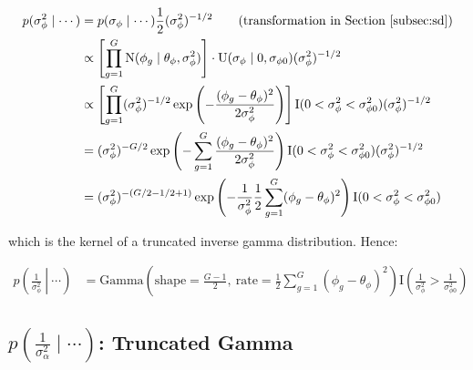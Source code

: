 \documentclass{article}\usepackage{graphicx, color}
\begin{document}
\begin{flushleft}
\begin{align*}
p(\sigma_\phi^2 \mid \cdots ) &= p(\sigma_\phi \mid \cdots) \frac{1}{2} (\sigma_\phi^2)^{-1/2} \qquad \text{(transformation in Section \ref{subsec:sd})} \\
&\propto \left [ \prod_{g = 1}^G \text{N}( \phi_g \mid \theta_\phi, \sigma_\phi^2) \right ] \cdot \text{U}(\sigma_\phi \mid 0, \sigma_{\phi 0})  (\sigma_\phi^2)^{-1/2}  \\ 
&\propto \left [ \prod_{g = 1}^G (\sigma_\phi^2)^{-1/2} \exp \left ( - \frac{(\phi_g - \theta_\phi)^2}{2 \sigma_\phi^2} \right )
 \right ] \text{I}(0 < \sigma_\phi^2 < \sigma_{\phi 0}^2) (\sigma_\phi^2)^{-1/2} \\
&=  (\sigma_\phi^2)^{-G/2} \exp \left ( - \sum_{g = 1}^G \frac{(\phi_g - \theta_\phi)^2}{2 \sigma_\phi^2} \right ) \text{I}(0 < \sigma_\phi^2 < \sigma_{\phi 0}^2) (\sigma_\phi^2)^{-1/2} \\
&=  (\sigma_\phi^2)^{-(G/2 - 1/2 +1) } \exp \left ( - \frac{1}{\sigma_\phi^2} \frac{1}{2} \sum_{g = 1}^G (\phi_g - \theta_\phi)^2 \right ) \text{I}(0 < \sigma_\phi^2 < \sigma_{\phi 0}^2) \\
\end{align*}

which is the kernel of a truncated inverse gamma distribution. Hence:

\begin{align*}
p \left ( \left . \frac{1}{\sigma_\phi^2} \  \right | \  \cdots \right ) &= \text{Gamma} \left ( \text{shape} = \frac{G - 1}{2}, \ \text{rate} =  \frac{1}{2} \sum_{g = 1}^G (\phi_g - \theta_\phi)^2  \right )   \text{I} \left (\frac{1}{\sigma_\phi^2} >\frac{1}{ \sigma_{\phi 0}^2} \right )
\end{align*}

\subsection{$p \left (\frac{1}{\sigma_\alpha^2} \mid \cdots \right )$: Truncated Gamma}


\end{flushleft}
\end{document}
